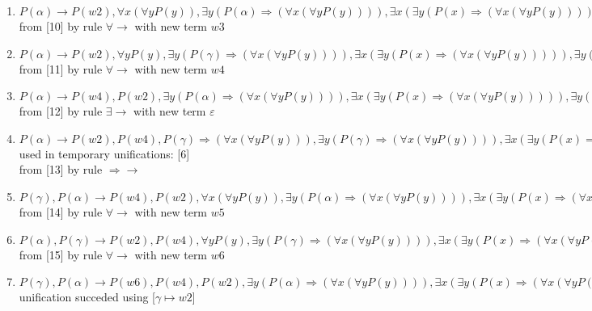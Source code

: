 \begin{enumerate}
  used in temporary unifications: [5]\\
 from [9] by rule $ \Rightarrow \rightarrow $
\item $P(\alpha) \rightarrow  P(w2),  \forall  x ( \forall  y P(y)),  \exists  y (P(\alpha)  \Rightarrow  ( \forall  x ( \forall  y P(y)))),  \exists  x ( \exists  y (P(x)  \Rightarrow  ( \forall  x ( \forall  y P(y))))),  \exists  y (P(\gamma)  \Rightarrow  ( \forall  x ( \forall  y P(y))))$\\
 from [10] by rule $\forall \rightarrow $ with new term $w3$
\item $P(\alpha) \rightarrow  P(w2),  \forall  y P(y),  \exists  y (P(\gamma)  \Rightarrow  ( \forall  x ( \forall  y P(y)))),  \exists  x ( \exists  y (P(x)  \Rightarrow  ( \forall  x ( \forall  y P(y))))),  \exists  y (P(\alpha)  \Rightarrow  ( \forall  x ( \forall  y P(y))))$\\
 from [11] by rule $\forall \rightarrow $ with new term $w4$
\item $P(\alpha) \rightarrow  P(w4), P(w2),  \exists  y (P(\alpha)  \Rightarrow  ( \forall  x ( \forall  y P(y)))),  \exists  x ( \exists  y (P(x)  \Rightarrow  ( \forall  x ( \forall  y P(y))))),  \exists  y (P(\gamma)  \Rightarrow  ( \forall  x ( \forall  y P(y))))$\\
 from [12] by rule $\exists \rightarrow $ with new term $\varepsilon$
\item $P(\alpha) \rightarrow  P(w2), P(w4), P(\gamma)  \Rightarrow  ( \forall  x ( \forall  y P(y))),  \exists  y (P(\gamma)  \Rightarrow  ( \forall  x ( \forall  y P(y)))),  \exists  x ( \exists  y (P(x)  \Rightarrow  ( \forall  x ( \forall  y P(y))))),  \exists  y (P(\alpha)  \Rightarrow  ( \forall  x ( \forall  y P(y))))$\\
  used in temporary unifications: [6]\\
 from [13] by rule $ \Rightarrow \rightarrow $
\item $P(\gamma), P(\alpha) \rightarrow  P(w4), P(w2),  \forall  x ( \forall  y P(y)),  \exists  y (P(\alpha)  \Rightarrow  ( \forall  x ( \forall  y P(y)))),  \exists  x ( \exists  y (P(x)  \Rightarrow  ( \forall  x ( \forall  y P(y))))),  \exists  y (P(\gamma)  \Rightarrow  ( \forall  x ( \forall  y P(y))))$\\
 from [14] by rule $\forall \rightarrow $ with new term $w5$
\item $P(\alpha), P(\gamma) \rightarrow  P(w2), P(w4),  \forall  y P(y),  \exists  y (P(\gamma)  \Rightarrow  ( \forall  x ( \forall  y P(y)))),  \exists  x ( \exists  y (P(x)  \Rightarrow  ( \forall  x ( \forall  y P(y))))),  \exists  y (P(\alpha)  \Rightarrow  ( \forall  x ( \forall  y P(y))))$\\
 from [15] by rule $\forall \rightarrow $ with new term $w6$
\item $P(\gamma), P(\alpha) \rightarrow  P(w6), P(w4), P(w2),  \exists  y (P(\alpha)  \Rightarrow  ( \forall  x ( \forall  y P(y)))),  \exists  x ( \exists  y (P(x)  \Rightarrow  ( \forall  x ( \forall  y P(y))))),  \exists  y (P(\gamma)  \Rightarrow  ( \forall  x ( \forall  y P(y))))$\\ 
 unification succeded using [$\gamma \mapsto w2$]
\end{enumerate}
%
